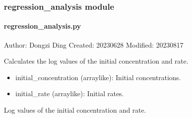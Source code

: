 \documentclass[a4paper,10pt,english]{sphinxmanual}
\begin{document}
\subsubsection{regression\_analysis module}
\label{\detokenize{utils:module-src.utils.regression_analysis}}\label{\detokenize{utils:regression-analysis-module}}

\paragraph{regression\_analysis.py}
\label{\detokenize{utils:regression-analysis-py}}
\sphinxAtStartPar
Author: Dongzi Ding
Created: 2023\sphinxhyphen{}06\sphinxhyphen{}28
Modified: 2023\sphinxhyphen{}08\sphinxhyphen{}17

\begin{fulllineitems}
\label{\detokenize{utils:src.utils.regression_analysis.calculate_log_values}}
\pysigstartsignatures
{}
\pysigstopsignatures
\sphinxAtStartPar
Calculates the log values of the initial concentration and rate.
\begin{description}
\begin{itemize}
\item {} 
\sphinxAtStartPar
initial\_concentration (array\sphinxhyphen{}like): Initial concentrations.

\item {} 
\sphinxAtStartPar
initial\_rate (array\sphinxhyphen{}like): Initial rates.

\end{itemize}

\sphinxAtStartPar
Log values of the initial concentration and rate.

\end{description}

\end{fulllineitems}

\end{document}
